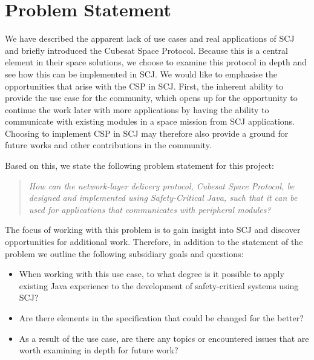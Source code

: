
\section{Problem Statement} %
\label{sec:problem_statement}
We have described the apparent lack of use cases and real applications of SCJ and briefly introduced the Cubesat Space Protocol. Because this is a central element in their space solutions, we choose to examine this protocol in depth and see how this can be implemented in SCJ. We would like to emphasise the opportunities that arise with the CSP in SCJ. First, the inherent ability to provide the use case for the community, which opens up for the opportunity to continue the work later with more applications by having the ability to communicate with existing modules in a space mission from SCJ applications. Choosing to implement CSP in SCJ may therefore also provide a ground for future works and other contributions in the community.

Based on this, we state the following problem statement for this project:
\begin{quotation}
	\textit{How can the network-layer delivery protocol, Cubesat Space Protocol, be designed and implemented using Safety-Critical Java, such that it can be used for applications that communicates with peripheral modules?}
\end{quotation}
The focus of working with this problem is to gain insight into SCJ and discover opportunities for additional work. Therefore, in addition to the statement of the problem we outline the following subsidiary goals and questions:
\begin{itemize}
	\item When working with this use case, to what degree is it possible to apply existing Java experience to the development of safety-critical systems using SCJ?
	\item Are there elements in the specification that could be changed for the better?
	\item As a result of the use case, are there any topics or encountered issues that are worth examining in depth for future work?
\end{itemize}

